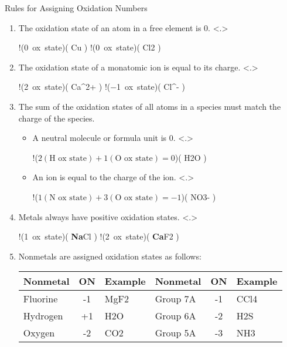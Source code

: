 \documentclass[notes=only]{beamer}
\begin{document}
\begin{frame}{Rules for Assigning Oxidation Numbers}
	\begin{enumerate}[<+->]
		\item The oxidation state of an atom in a free element
			is 0.
			\note<.>{
				\begin{reaction*}
					!(0~ox~state)( Cu ) 
					\qquad\qquad 
					!(0~ox~state)( Cl2 )
				\end{reaction*}
				}
		\item The oxidation state of a monatomic ion is equal to
			its charge.
			\note<.>{
				\begin{reaction*}
					!(\num{+2}~ox~state)( Ca^{2+} )
					\qquad\qquad
					!(\num{-1}~ox~state)( Cl^{-} )
				\end{reaction*}
				}
		\item The sum of the oxidation states of all atoms in a
			species must match the charge of the species.
			\begin{itemize}
				\item A neutral molecule or formula unit
					is 0.
					\note<.>{
						\begin{reaction*}
							!({$2 (\text{H~ox~state})
							+ 1 (\text{O~ox~state})
							= 0$})( H2O )
						\end{reaction*}
						}
				\item An ion is equal to the charge of
					the ion.
					\note<.>{
						\begin{reaction*}
							!({$1 (\text{N~ox~state})
							+ 3 (\text{O~ox~state})
							= -1$})( NO3- )
						\end{reaction*}
						}
			\end{itemize}
		\item Metals always have positive oxidation states.
			\note<.>{
				\begin{reaction*}
					!(\num{+1}~ox~state)(
					\textbf{\usebeamercolor[fg]{alerted
					text}Na}Cl )
					\qquad\qquad
					!(\num{+2}~ox~state)( \textbf{Ca}F2 )
				\end{reaction*}
				}
		\item Nonmetals are assigned oxidation states as follows:
			\begin{center}
				\small
				\begin{tabular} {l S e | l S e}
					\toprule
					\textbf{Nonmetal} & \textbf{ON} & \textbf{Example} &
					\textbf{Nonmetal} & \textbf{ON} & \textbf{Example} \\
					\midrule
					Fluorine & -1 & MgF2 & Group 7A & -1 & CCl4 \\
					Hydrogen & +1 & H2O  & Group 6A & -2 & H2S \\
					Oxygen & -2 & CO2    & Group 5A & -3 & NH3 \\
					\bottomrule
				\end{tabular}
			\end{center}
	\end{enumerate}
\end{frame}
\end{document}
